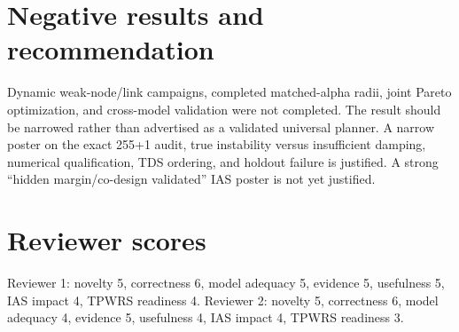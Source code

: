 \documentclass[10pt,a4paper]{article}
\begin{document}
\section{Negative results and recommendation}
Dynamic weak-node/link campaigns, completed matched-alpha radii, joint Pareto optimization, and cross-model validation were not completed. The result should be narrowed rather than advertised as a validated universal planner. A narrow poster on the exact 255+1 audit, true instability versus insufficient damping, numerical qualification, TDS ordering, and holdout failure is justified. A strong “hidden margin/co-design validated” IAS poster is not yet justified.

\section*{Reviewer scores}
Reviewer 1: novelty 5, correctness 6, model adequacy 5, evidence 5, usefulness 5, IAS impact 4, TPWRS readiness 4. Reviewer 2: novelty 5, correctness 6, model adequacy 4, evidence 5, usefulness 4, IAS impact 4, TPWRS readiness 3.
\end{document}
